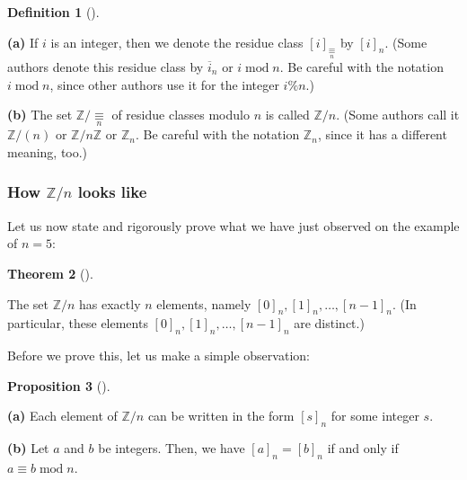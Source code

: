 \documentclass[numbers=enddot,12pt,final,onecolumn,notitlepage]{scrartcl}%
\numberwithin{exer}{subsection}
\theoremstyle{definition}
\newtheorem{theo}{Theorem}[subsection]
\newenvironment{theorem}[1][]
{\begin{theo}[#1]\begin{leftbar}}
{\end{leftbar}\end{theo}}
\newtheorem{prop}[theo]{Proposition}
\newenvironment{proposition}[1][]
{\begin{prop}[#1]\begin{leftbar}}
{\end{leftbar}\end{prop}}
\newtheorem{defi}[theo]{Definition}
\newenvironment{definition}[1][]
{\begin{defi}[#1]\begin{leftbar}}
{\end{leftbar}\end{defi}}
\begin{document}
\begin{definition}
\label{def.eqrel.Z/n.Z/n}\textbf{(a)} If $i$ is an integer, then we denote the
residue class $\left[  i\right]  _{\underset{n}{\equiv}}$ by $\left[
i\right]  _{n}$. (Some authors denote this residue class by $\overline{i}_{n}$
or $i\operatorname{mod}n$. Be careful with the notation $i\operatorname{mod}%
n$, since other authors use it for the integer $i\%n$.)

\textbf{(b)} The set $\mathbb{Z}/\underset{n}{\equiv}$ of residue classes
modulo $n$ is called $\mathbb{Z}/n$. (Some authors call it $\mathbb{Z}/\left(
n\right)  $ or $\mathbb{Z}/n\mathbb{Z}$ or $\mathbb{Z}_{n}$. Be careful with
the notation $\mathbb{Z}_{n}$, since it has a different meaning, too.)
\end{definition}

\subsubsection{How $\mathbb{Z}/n$ looks like}

Let us now state and rigorously prove what we have just observed on the
example of $n=5$:

\begin{theorem}
\label{thm.eqrel.Z/n.explicit}The set $\mathbb{Z}/n$ has exactly $n$ elements,
namely $\left[  0\right]  _{n},\left[  1\right]  _{n},\ldots,\left[
n-1\right]  _{n}$. (In particular, these elements $\left[  0\right]
_{n},\left[  1\right]  _{n},\ldots,\left[  n-1\right]  _{n}$ are distinct.)
\end{theorem}

Before we prove this, let us make a simple observation:

\begin{proposition}
\label{prop.eqrel.Z/n.ab}\textbf{(a)} Each element of $\mathbb{Z}/n$ can be
written in the form $\left[  s\right]  _{n}$ for some integer $s$.

\textbf{(b)} Let $a$ and $b$ be integers. Then, we have $\left[  a\right]
_{n}=\left[  b\right]  _{n}$ if and only if $a\equiv b\operatorname{mod}n$.
\end{proposition}
\end{document}
